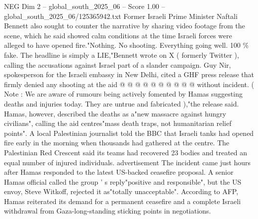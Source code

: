 \begin{textsample}{NEG Dim 2 – global\_south\_2025\_06 – Score 1.00 – global\_south\_2025\_06/125365942.txt}
Former Israeli Prime Minister Naftali Bennett also sought to counter the narrative by sharing video footage from the scene, which he said showed calm conditions at the time Israeli forces were alleged to have opened fire."Nothing.
No shooting.
Everything going well. 100 \% fake.
The headline is simply a LIE,"Bennett wrote on X ( formerly Twitter ), calling the accusations against Israel part of a slander campaign.
Guy Nir, spokesperson for the Israeli embassy in New Delhi, cited a GHF press release that firmly denied any shooting at the aid @ @ @ @ @ @ @ @ @ @ without incident. ( Note : We are aware of rumours being actively fomented by Hamas suggesting deaths and injuries today.
They are untrue and fabricated ),"the release said.
Hamas, however, described the deaths as a"new massacre against hungry civilians", calling the aid centres"mass death traps, not humanitarian relief points".
A local Palestinian journalist told the BBC that Israeli tanks had opened fire early in the morning when thousands had gathered at the centre.
The Palestinian Red Crescent said its teams had recovered 23 bodies and treated an equal number of injured individuals. advertisement The incident came just hours after Hamas responded to the latest US-backed ceasefire proposal.
A senior Hamas official called the group ' s reply"positive and responsible", but the US envoy, Steve Witkoff, rejected it as"totally unacceptable".
According to AFP, Hamas reiterated its demand for a permanent ceasefire and a complete Israeli withdrawal from Gaza-long-standing sticking points in negotiations.

\end{textsample}
